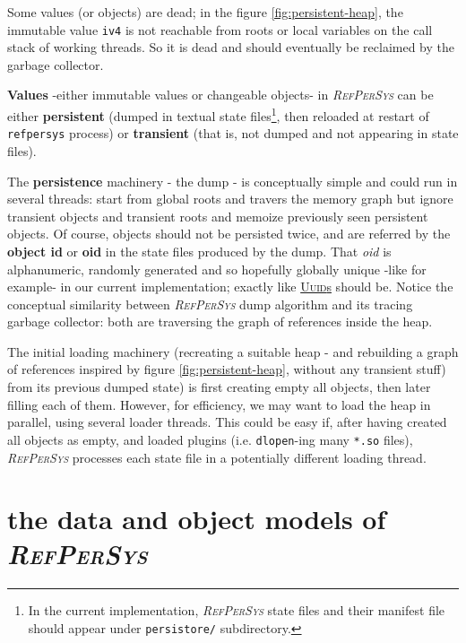 \documentclass[11pt,a4paper,svgnames]{article}
\newcommand{\RefPerSys}{{\textit{\textsc{RefPerSys}}}}
\begin{document}
Some values (or objects) are dead; in the figure
\ref{fig:persistent-heap}, the immutable value \texttt{iv4} is not
reachable from roots or local variables on the call stack of working
threads. So it is dead and should eventually be reclaimed by the
garbage collector.

\textbf{Values} -either immutable values or changeable objects- in
{\RefPerSys} can be either \textbf{persistent} (dumped in
textual state files\footnote{In the current implementation,
{\RefPerSys} state files and their manifest file should appear
under \texttt{persistore/} subdirectory.}, then reloaded at
restart of \texttt{refpersys} process) or \textbf{transient}
(that is, not dumped and not appearing in state files).

The \textbf{persistence} machinery - the dump - is conceptually simple
and could run in several threads: start from global roots and travers
the memory graph but ignore transient objects and transient roots and
memoize previously seen persistent objects. Of course, objects should
not be persisted twice, and are referred by the \textbf{object id} or
\textbf{oid} in the state files produced by the dump. That
\textit{oid} is alphanumeric, randomly generated and so hopefully
globally unique -like {}
for example- in our current implementation; exactly like
\href{https://en.wikipedia.org/wiki/Universally_unique_identifier}{\textsc{Uuid}s}
should be. Notice the conceptual similarity between {\RefPerSys} dump
algorithm and its tracing garbage collector: both are traversing the
graph of references inside the heap.

The initial loading machinery (recreating a suitable heap - and
rebuilding a graph of references inspired by figure
\ref{fig:persistent-heap}, without any transient stuff) from its
previous dumped state) is first creating empty all objects, then later
filling each of them. However, for efficiency, we may want to load the
heap in parallel, using several loader threads. This could be easy if,
after having created all objects as empty, and loaded plugins
(i.e. \texttt{dlopen}-ing many \texttt{*.so} files), {\RefPerSys}
processes each state file in a potentially different loading thread.

\bigskip

\section{the data and object models of \RefPerSys}
\label{sec:dataobjmodel}
\end{document}

